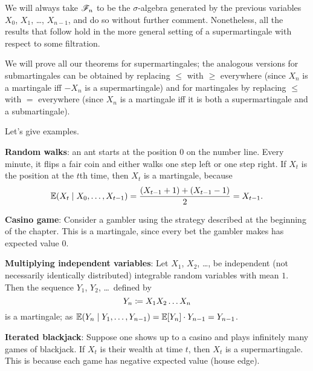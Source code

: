 
\begin{abuse}
	We will always take $\mathscr F_n$ to be the $\sigma$-algebra
	generated by the previous variables $X_0$, $X_1$, \dots, $X_{n-1}$,
	and do so without further comment.
	Nonetheless, all the results that follow hold in the more general setting
	of a supermartingale with respect to some filtration.
\end{abuse}

We will prove all our theorems for supermartingales;
the analogous versions for submartingales can be obtained
by replacing $\le$ with $\ge$ everywhere
(since $X_n$ is a martingale iff $-X_n$ is a supermartingale)
and for martingales by replacing $\le$ with $=$ everywhere
(since $X_n$ is a martingale iff it is both a supermartingale
and a submartingale).

Let's give examples.
\begin{example}
	[Supermartingales]
	\listhack
	\begin{enumerate}[(a)]
		\ii \textbf{Random walks}:
		an ant starts at the position $0$ on the number line.
		Every minute, it flips a fair coin and either
		walks one step left or one step right.
		If $X_t$ is the position at the $t$th time,
		then $X_t$ is a martingale, because
		\[ \mathbb E(X_t \mid X_0, \dots, X_{t-1})
			= \frac{(X_{t-1}+1) + (X_{t-1}-1)}{2} = X_{t-1}. \]

		\ii \textbf{Casino game}:
		Consider a gambler using the strategy described
		at the beginning of the chapter.
		This is a martingale, since every bet the gambler makes
		has expected value $0$.

		\ii \textbf{Multiplying independent variables}:
		Let $X_1$, $X_2$, \dots, be independent (not necessarily
		identically distributed) integrable random variables with mean $1$.
		Then the sequence $Y_1$, $Y_2$, \dots\ defined by
		\[ Y_n \coloneqq X_1 X_2 \dots X_n \]
		is a martingale; as
		$\mathbb E(Y_n \mid Y_1, \dots, Y_{n-1}) = \mathbb E[Y_n] \cdot Y_{n-1} = Y_{n-1}$.

		\ii \textbf{Iterated blackjack}:
		Suppose one shows up to a casino and plays
		infinitely many games of blackjack.
		If $X_t$ is their wealth at time $t$, then $X_t$ is a supermartingale.
		This is because each game has negative expected value (house edge).
	\end{enumerate}
\end{example}

